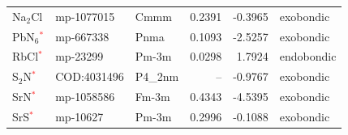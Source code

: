 \begin{longtable}{@{}lllrrl@{}}
Na$_{2}$Cl & mp-1077015 & Cmmm & 0.2391 & -0.3965 & exobondic \\
PbN$_{6}$\textcolor{red}{$^*$} & mp-667338 & Pnma & 0.1093 & -2.5257 & exobondic \\
RbCl\textcolor{red}{$^*$} & mp-23299 & Pm-3m & 0.0298 & 1.7924 & endobondic \\
S$_{2}$N\textcolor{red}{$^*$} & COD:4031496 & P4\_2nm & -- & -0.9767 & exobondic \\
SrN\textcolor{red}{$^*$} & mp-1058586 & Fm-3m & 0.4343 & -4.5395 & exobondic \\
SrS\textcolor{red}{$^*$} & mp-10627 & Pm-3m & 0.2996 & -0.1088 & exobondic \\
\end{longtable}
